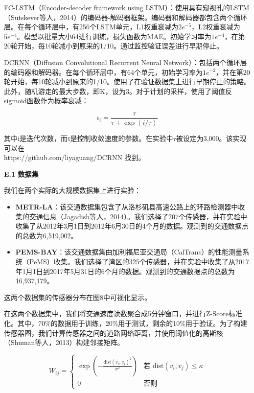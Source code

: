 \documentclass[10.5pt,compsoc,UTF8]{CjC}
\theoremstyle{mystyle}
\begin{document}
FC-LSTM（Encoder-decoder framework using LSTM）：使用具有窥视孔的LSTM（Sutskever等人，2014）的编码器-解码器框架。编码器和解码器都包含两个循环层。在每个循环层中，有256个LSTM单元，L1权重衰减为$2e^{-5}$，L2权重衰减为$5e^{-4}$。模型以批量大小64进行训练，损失函数为MAE。初始学习率为$1e^{-4}$，在第20轮开始，每10轮减小到原来的1/10。通过监控验证误差进行早期停止。

DCRNN（Diffusion Convolutional Recurrent Neural Network）：包括两个循环层的编码器和解码器。在每个循环层中，有64个单元，初始学习率为$1e^{-2}$，并在第20轮开始，每10轮减小到原来的1/10。使用了在验证数据集上进行早期停止的策略。此外，随机游走的最大步数，即K，设为3。对于计划的采样，使用了阈值反sigmoid函数作为概率衰减：

\[\epsilon_{i}=\frac{\tau}{\tau+\exp (i / \tau)}\]

其中i是迭代次数，而τ是控制收敛速度的参数。在实验中$\tau$被设定为3,000。该实现可以在\\ https://github.com/liyaguang/DCRNN 找到。




\textbf{E.1 数据集}

我们在两个实际的大规模数据集上进行实验：

\begin{itemize}
	\item \textbf{METR-LA}：该交通数据集包含了从洛杉矶县高速公路上的环路检测器中收集的交通信息（Jagadish等人，2014）。我们选择了207个传感器，并在实验中收集了从2012年3月1日到2012年6月30日的4个月的数据。观测到的交通数据点的总数为6,519,002。
	\item \textbf{PEMS-BAY}：该交通数据集由加利福尼亚交通局（CalTrans）的性能测量系统（PeMS）收集。我们选择了湾区的325个传感器，并在实验中收集了从2017年1月1日到2017年5月31日的6个月的数据。观测到的交通数据点的总数为16,937,179。
\end{itemize}

这两个数据集的传感器分布在图8中可视化显示。

在这两个数据集中，我们将交通速度读数聚合成5分钟窗口，并进行Z-Score标准化。其中，70\%的数据用于训练，20\%用于测试，剩余的10\%用于验证。为了构建传感器图，我们计算传感器之间的道路网络距离，并使用阈值化的高斯核（Shuman等人，2013）构建邻接矩阵。

\[
W_{ij} = 
\begin{cases}
	\exp\left(-\frac{\text{dist}(v_i, v_j)^2}{\sigma^2}\right) & \text{若 } \text{dist}(v_i, v_j) \leq \kappa \\
	0 & \text{否则}
\end{cases}
\]
\end{document}
